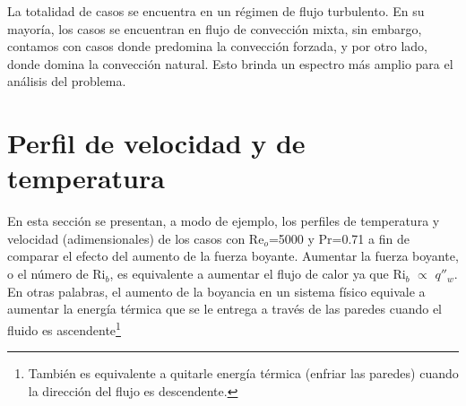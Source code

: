 La totalidad de casos se encuentra en un régimen de flujo turbulento. En su mayoría, los casos se encuentran en flujo de convección mixta, sin embargo, contamos con casos donde predomina la convección forzada, y por otro lado, donde domina la convección natural. Esto brinda un espectro más amplio para el análisis del problema.




\section{Perfil de velocidad y de temperatura}

En esta sección se presentan, a modo de ejemplo, los perfiles de temperatura y velocidad (adimensionales) de los casos con Re$_o$=5000 y Pr=0.71 a fin de comparar el efecto del aumento de la fuerza boyante. Aumentar la fuerza boyante, o el número de Ri$_b$, es equivalente a aumentar el flujo de calor ya que Ri$_b$ $\propto$ $q''_w$. En otras palabras, el aumento de la boyancia en un sistema físico equivale a aumentar la energía térmica que se le entrega a través de las paredes cuando el fluido es ascendente\footnote{También es equivalente a quitarle energía térmica (enfriar las paredes) cuando la dirección del flujo es descendente.} 


\begin{figure}[H]
  \centering
  \caption{}
  \label{fig:Re5000-Pr071}
\end{figure}

